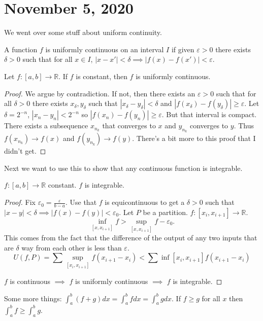 \documentclass{article}
\newcommand{\R}{\mathbb{R}}
\newcommand{\eps}{\varepsilon}
\newcommand{\ra}[1][]{\xrightarrow{#1}}
\begin{document}
\section{November 5, 2020}
We went over some stuff about uniform continuity.
\begin{definition}
A function $f$ is uniformly continuous on an interval $I$ if given $\eps>0$ there exists $\delta>0$ such that for all $x\in I$, $|x-x'|<\delta\implies |f(x)-f(x')|<\eps$.
\end{definition}
\begin{theorem}
Let $f:[a,b]\ra\R$. If $f$ is constant, then $f$ is uniformly continuous.
\end{theorem}
\begin{proof}
We argue by contradiction. If not, then there exists an $\eps>0$ such that for all $\delta>0$ there exists $x_\delta,y_\delta$ such that $|x_\delta-y_\delta|<\delta$ and $|f(x_\delta)-f(y_\delta)|\geq\eps$. Let $\delta=2^{-n}$, $|x_n-y_n|<2^{-n}$ so $|f(x_n)-f(y_n)|\geq \eps$. But that interval is compact. There exists a subsequence $x_{n_k}$ that converges to $x$ and $y_{n_k}$ converges to $y$. Thus $f(x_{n_k})\ra f(x)$ and $f(y_{n_k})\ra f(y)$. There's a bit more to this proof that I didn't get.
\end{proof}
Next we want to use this to show that any continuous function is integrable.
\begin{theorem}
$f:[a,b]\ra\R$ constant. $f$ is integrable.
\end{theorem}
\begin{proof}
Fix $\eps_0=\frac{\eps}{b-a}$. Use that $f$ is equicontinuous to get a $\delta>0$ such that $|x-y|<\delta\implies |f(x)-f(y)|<\eps_0$. Let $P$ be a partition. $f:[x_i,x_{i+1}]\ra\R$. $$\inf_{[x,x_{i+1}]}f>\sup_{[x,x_{i+1}]} f-\eps_0.$$ This comes from the fact that the difference of the output of any two inputs that are $\delta$ way from each other is less than $\eps$. $$U(f,P)=\sum \sup_{[x_i,x_{i+1}]}f(x_{i+1}-x_i)<\sum \inf{[x_i,x_{i+1}]}f(x_{i+1}-x_i)$$

$f$ is continuous $\implies$ $f$ is uniformly continuous $\implies $ $f$ is integrable.
\end{proof}

Some more things: $\int_a^b(f+g)dx=\int_a^bfdx=\int_a^bgdx$. If $f\geq g$ for all $x$ then $\int_a^b f\geq\int_a^b g$.
\end{document}
